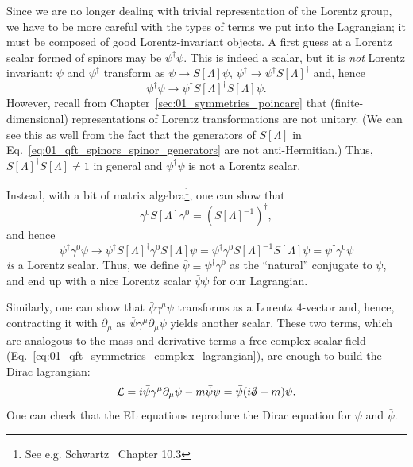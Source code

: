Since we are no longer dealing with trivial representation of the Lorentz group, we have to be more careful with the types of terms we put into the Lagrangian; it must be composed of good Lorentz-invariant objects.
A first guess at a Lorentz scalar formed of spinors may be $\psi^\dagger\psi$.
This is indeed a scalar, but it is \textit{not} Lorentz invariant:
$\psi$ and $\psi^\dagger$ transform as $\psi\rightarrow S[\Lambda]\psi$, $\psi^\dagger\rightarrow \psi^\dagger S[\Lambda]^\dagger$ and, hence
\begin{equation}
	\label{eq:01_qft_spinors_lagrangian_scalar_wrong}
	\psi^\dagger\psi \rightarrow \psi^\dagger S[\Lambda]^\dagger S[\Lambda]\psi. %
\end{equation}
However, recall from Chapter~\ref{sec:01_symmetries_poincare} that (finite-dimensional) representations of Lorentz transformations are not unitary.
(We can see this as well from the fact that the generators of $S[\Lambda]$ in Eq.~\ref{eq:01_qft_spinors_spinor_generators} are not anti-Hermitian.)
Thus, $S[\Lambda]^\dagger S[\Lambda] \neq 1$ in general and $\psi^\dagger\psi$ is not a Lorentz scalar.

Instead, with a bit of matrix algebra\footnote{See e.g. Schwartz~\cite{Schwartz:2014sze} Chapter 10.3}, one can show that
\begin{equation}
	\label{eq:01_qft_spinors_gamma0_inverse}
	\gamma^0 S[\Lambda] \gamma^0 = (S[\Lambda]^{-1})^\dagger,
\end{equation}
and hence
\begin{equation}
	\label{eq:01_qft_spinors_lagrangian_scalar}
	\psi^\dagger\gamma^0\psi \rightarrow \psi^\dagger S[\Lambda]^\dagger \gamma^0 S[\Lambda]\psi = \psi^\dagger\gamma^0 S[\Lambda]^{-1} S[\Lambda]\psi = \psi^\dagger\gamma^0\psi
\end{equation}
\textit{is} a Lorentz scalar.
Thus, we define $\bar\psi \equiv \psi^\dagger\gamma^0$ as the ``natural'' conjugate to $\psi$, and end up with a nice Lorentz scalar $\bar\psi \psi$ for our Lagrangian.

Similarly, one can show that $\bar\psi\gamma^\mu\psi$ transforms as a Lorentz $4$-vector and, hence, contracting it with $\partial_\mu$ as $\bar\psi\gamma^\mu\partial_\mu\psi$ yields another scalar.
These two terms, which are analogous to the mass and derivative terms a free complex scalar field (Eq.~\ref{eq:01_qft_symmetries_complex_lagrangian}), are enough to build the Dirac lagrangian:
\begin{equation}
	\label{eq:01_qft_spinors_lagrangian}
	\mathcal{L} = i\bar\psi\gamma^\mu\partial_\mu\psi - m\bar\psi\psi = \bar\psi(i\cslashed{\partial} - m)\psi.
\end{equation}
One can check that the EL equations reproduce the Dirac equation for $\psi$ and $\bar\psi$.

